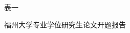 %
\begin{titlepage}
\thispagestyle{empty}%
\begin{flushright}
{\linespread{1.0}表\quad 一}\par
\end{flushright}
\vspace{-1.5em}
\begin{center}
{\linespread{1.0}\heiti 福州大学专业学位研究生论文开题报告}\par
\end{center}
\vspace{-0.2em}


\end{titlepage}
